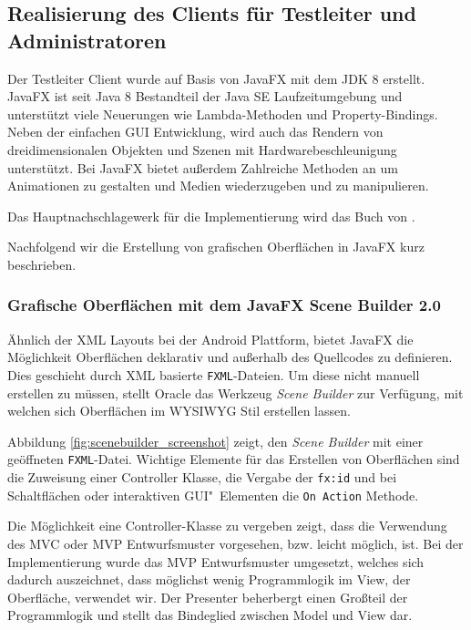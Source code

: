 \subsection{Realisierung des Clients für Testleiter und Administratoren}
Der Testleiter Client wurde auf Basis von JavaFX mit dem \ac{JDK} 8 erstellt.
JavaFX ist seit Java 8 Bestandteil der Java SE Laufzeitumgebung und unterstützt viele Neuerungen wie Lambda-Methoden und Property-Bindings.
Neben der einfachen \ac{GUI} Entwicklung, wird auch das Rendern von dreidimensionalen Objekten und Szenen mit Hardwarebeschleunigung unterstützt.
Bei JavaFX bietet außerdem Zahlreiche Methoden an um Animationen zu gestalten und Medien wiederzugeben und zu manipulieren.

Das Hauptnachschlagewerk für die Implementierung wird das Buch  von \citeauthor{Dea.2014} \cite{Dea.2014}.

Nachfolgend wir die Erstellung von grafischen Oberflächen in JavaFX kurz beschrieben.

\subsubsection{Grafische Oberflächen mit dem JavaFX Scene Builder 2.0}
Ähnlich der \ac{XML} Layouts bei der Android Plattform, bietet JavaFX die Möglichkeit Oberflächen deklarativ und außerhalb des Quellcodes zu definieren.
Dies geschieht durch \ac{XML} basierte \texttt{FXML}-Dateien.
Um diese nicht manuell erstellen zu müssen, stellt Oracle das Werkzeug \emph{Scene Builder} \cite{OracleCorporation.2014c} zur Verfügung, mit welchen sich Oberflächen im \ac{WYSIWYG} Stil erstellen lassen.

Abbildung \ref{fig:scenebuilder_screenshot} zeigt, den \emph{Scene Builder} mit einer geöffneten \texttt{FXML}-Datei.
Wichtige Elemente für das Erstellen von Oberflächen sind die Zuweisung einer Controller Klasse, die Vergabe der \texttt{fx:id} und bei Schaltflächen oder interaktiven \ac{GUI}"~Elementen die \texttt{On Action} Methode.

Die Möglichkeit eine Controller-Klasse zu vergeben zeigt, dass die Verwendung des \ac{MVC} oder \ac{MVP} Entwurfsmuster vorgesehen, bzw. leicht möglich, ist.  
Bei der Implementierung wurde das \ac{MVP} Entwurfsmuster umgesetzt, welches sich dadurch auszeichnet, dass möglichst wenig Programmlogik im View, der Oberfläche, verwendet wir.
Der Presenter beherbergt einen Großteil der Programmlogik und stellt das Bindeglied zwischen Model und View dar. \cite[Vgl.][74]{Dea.2014}

